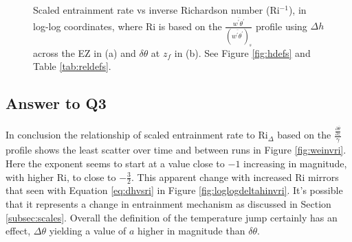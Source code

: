 \begin{figure}[htbp]
\begin{minipage}[b]{0.5\linewidth}
        \\
        \end{minipage}             
\quad
\begin{minipage}[b]{0.5\linewidth}
        \\
       
       \end{minipage}
        \caption[Scaled entrainment rate vs inverse Richardson number (ii)]{Scaled entrainment rate vs inverse Richardson number (\acs{Ri}$^{-1}$), in log-log coordinates, where \acs{Ri} is based on the $\frac{\overline{w^{'}\theta^{'}}}{(\overline{w^{'}\theta^{'}})_{s}}$
profile using $\Delta h$ across the \acs{EZ} in (a) and $\delta \theta$ at $z_{f}$ in (b).  See Figure \ref{fig:hdefs} and Table \ref{tab:reldefs}.}
        \label{fig:weinvri_f}
\end{figure}

\subsection{Answer to Q3}
In conclusion the relationship of scaled entrainment rate to \acs{Ri}$_{\Delta}$ based on the $\frac{\frac{\partial \overline{\theta}}{\partial z}}{\gamma}$ profile shows the least scatter over time and between runs in Figure \ref{fig:weinvri}.  Here the exponent seems to start at a value close to $-1$ increasing in magnitude, with higher \acs{Ri}, to close to $-\frac{3}{2}$.  This apparent change with increased \acs{Ri} mirrors that seen with Equation \ref{eq:dhvsri} in Figure \ref{fig:loglogdeltahinvri}.  It's possible that it represents a change in entrainment mechanism as discussed in Section \ref{subsec:scales}.  Overall the definition of the temperature jump certainly has an effect, $\Delta \theta$ yielding a value of $a$ higher in magnitude than $\delta \theta$.

\endinput

Any text after an \endinput is ignored.
You could put scraps here or things in progress.
